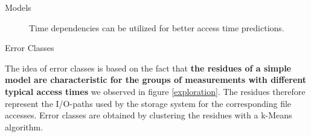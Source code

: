 \documentclass[final]{beamer}
\newlength{\onecolwid}
\begin{document}
\begin{frame}[t]
\begin{columns}[t]
\begin{column}{\onecolwid}
\begin{block}{Models}
	\begin{figure}
		\hfill
		\caption{Time dependencies can be utilized for better access time predictions.}
		\label{time_dep}
	\end{figure} 
	
	
\end{block}

\vspace*{-2cm}
\begin{block}{Error Classes}
	
The idea of error classes is based on the fact that \textbf{the residues of a simple model are characteristic for the groups of measurements with different typical access times} we observed in figure \ref{exploration}. The residues therefore represent the I/O-paths used by the storage system for the corresponding file accesses. 
Error classes are obtained by clustering the residues with a k-Means algorithm.


\end{block}
\end{column}
\end{columns}
\end{frame}
\end{document}
